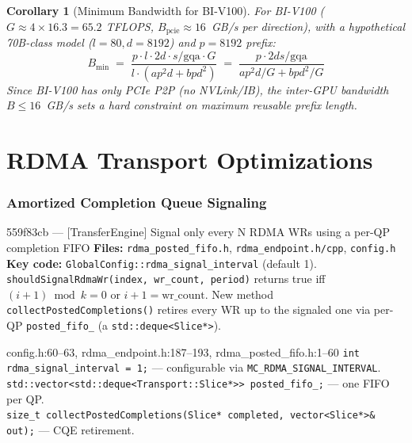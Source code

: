 \documentclass[11pt,a4paper,twoside]{article}
\theoremstyle{plain}
\newtheorem{corollary}[theorem]{Corollary}
\theoremstyle{definition}
\theoremstyle{remark}
\begin{document}
\begin{corollary}[Minimum Bandwidth for BI-V100]
\label{cor:biv100-bandwidth}
For BI-V100 ($G \approx 4 \times 16.3 = 65.2$ TFLOPS, $B_{\text{pcie}} \approx 16$~GB/s
per direction), with a hypothetical 70B-class model ($l=80, d=8192$) and $p=8192$ prefix:
\[
  B_{\min} \;=\; \frac{p \cdot l \cdot 2d \cdot s / \text{gqa} \cdot G}
  {l \cdot (ap^2 d + bpd^2)}
  \;=\; \frac{p \cdot 2ds / \text{gqa}}{ap^2d/G + bpd^2/G}
\]
Since BI-V100 has only PCIe P2P (no NVLink/IB), the inter-GPU bandwidth
$B \leq 16$~GB/s sets a hard constraint on maximum reusable prefix length.
\end{corollary}



\part{RDMA Transport Optimizations}

\section{Amortized Completion Queue Signaling}
\label{sec:amortized-cqe}

\begin{commitbox}{559f83cb --- [TransferEngine] Signal only every N RDMA WRs using a per-QP
completion FIFO}
\textbf{Files:} \texttt{rdma\_posted\_fifo.h}, \texttt{rdma\_endpoint.h/cpp}, \texttt{config.h}\\
\textbf{Key code:} \texttt{GlobalConfig::rdma\_signal\_interval} (default 1).
\texttt{shouldSignalRdmaWr(index, wr\_count, period)} returns true iff
$(i+1) \bmod k = 0$ or $i+1 = \text{wr\_count}$. New method
\texttt{collectPostedCompletions()} retires every WR up to the signaled one via per-QP
\texttt{posted\_fifo\_} (a \texttt{std::deque<Slice*>}).
\end{commitbox}

\begin{codeline}{config.h:60--63, rdma\_endpoint.h:187--193, rdma\_posted\_fifo.h:1--60}
\texttt{int rdma\_signal\_interval = 1;} --- configurable via \texttt{MC\_RDMA\_SIGNAL\_INTERVAL}.\\
\texttt{std::vector<std::deque<Transport::Slice*>> posted\_fifo\_;} --- one FIFO per QP.\\
\texttt{size\_t collectPostedCompletions(Slice* completed, vector<Slice*>\& out);} --- CQE retirement.
\end{codeline}
\end{document}
